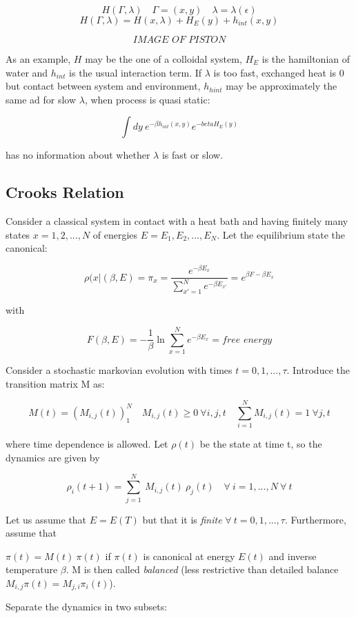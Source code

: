 \documentclass{article}
\begin{document}
$$H(\Gamma,\lambda) \quad \Gamma = (x,y) \quad \lambda = \lambda(\epsilon)$$
$$H(\Gamma,\lambda) = H(x,\lambda) + H_E(y) + h_{int}(x,y)$$

$$\textit{ IMAGE OF PISTON }$$

As an example, $H$ may be the one of a colloidal system, $H_E$ is the hamiltonian of water and $h_{int}$ is the usual interaction term. 
If $\lambda$ is too fast, exchanged heat is $0$ but contact between system and environment, $h_{hint}$ may be approximately the same ad for slow $\lambda$, when process is quasi static:

$$\int dy \ e^{-\beta h_{int}(x,y)} e^{-beta H_E(y)}$$

has no information about whether $\lambda$ is fast or slow.

\subsection{Crooks Relation}

Consider a classical system in contact with a heat bath and having finitely many states $x=1,2,...,N$ of energies $E=E_1,E_2,...,E_N$. Let the equilibrium state the canonical:

$$\rho(x|(\beta,E) = \pi_x = \frac{e^{-\beta E_x}}{\sum_{x'=1}^{N} e^{-\beta E_{x'}}} = e^{\beta F - \beta E_x }$$

with

$$F(\beta,E) = - \frac{1}{\beta} \ln \sum_{x=1}^{N} e^{-\beta E_x} = \textit{free energy}$$

Consider a stochastic markovian evolution with times $t=0,1,...,\tau$. Introduce the transition matrix M as:

$$M(t) = (M_{i,j}(t))_1^N \quad M_{i,j}(t) \geq 0 \ \forall i,j,t \quad \sum_{i=1}^{N} M_{i,j}(t)=1 \ \forall j,t$$

where time dependence is allowed. Let $\rho(t)$ be the state at time t, so the dynamics are given by

$$\rho_i(t+1) = \sum_{j=1}^{N} \ M_{i,j}(t) \ \rho_j(t) \quad \forall \ i=1,...,N  \ \forall \ t $$

Let us assume that $E=E(T)$ but that it is \emph{finite} $\forall \ t=0,1,...,\tau$. Furthermore, assume that 

$\pi(t) = M(t) \ \pi(t)$ if $\pi(t)$ is canonical at energy $E(t)$ and inverse temperature $\beta$. M is then called \emph{balanced} (less restrictive than detailed balance $M_{i,j}\pi(t) = M_{j,i}\pi_i(t)$).

Separate the dynamics in two subsets:
\end{document}
